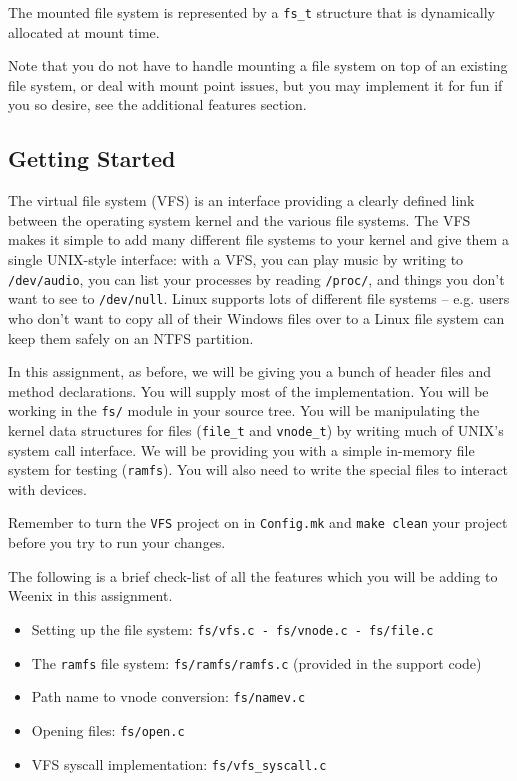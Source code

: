The mounted file system is represented by a \texttt{fs\_t} structure that is dynamically allocated at mount time.

Note that you do not have to handle mounting a file system on top of an existing file system, or deal with mount point issues, but you may implement it for fun if you so desire, see the additional features section.

\subsection{Getting Started}

The virtual file system (VFS) is an interface providing a clearly defined link between the operating system kernel and the various file systems. The VFS makes it simple to add many different file systems to your kernel and give them a single UNIX-style interface: with a VFS, you can play music by writing to \texttt{/dev/audio}, you can list your processes by reading \texttt{/proc/}, and things you don't want to see to \texttt{/dev/null}. Linux supports lots of different file systems -- e.g. users who don't want to copy all of their Windows files over to a Linux file system can keep them safely on an NTFS partition.

In this assignment, as before, we will be giving you a bunch of header files and method declarations. You will supply most of the implementation. You will be working in the \texttt{fs/} module in your source tree. You will be manipulating the kernel data structures for files (\texttt{file\_t} and \texttt{vnode\_t}) by writing much of UNIX's system call interface. We will be providing you with a simple in-memory file system for testing (\texttt{ramfs}). You will also need to write the special files to interact with devices.

Remember to turn the \texttt{VFS} project on in \texttt{Config.mk} and \texttt{make clean} your project before you try to run your changes.

The following is a brief check-list of all the features which you will be adding to Weenix in this assignment.

\begin{itemize}
\item Setting up the file system: \texttt{fs/vfs.c - fs/vnode.c - fs/file.c}
\item The \texttt{ramfs} file system: \texttt{fs/ramfs/ramfs.c} (provided in the support code)
\item Path name to vnode conversion: \texttt{fs/namev.c}
\item Opening files: \texttt{fs/open.c}
\item VFS syscall implementation: \texttt{fs/vfs\_syscall.c}
\end{itemize}

